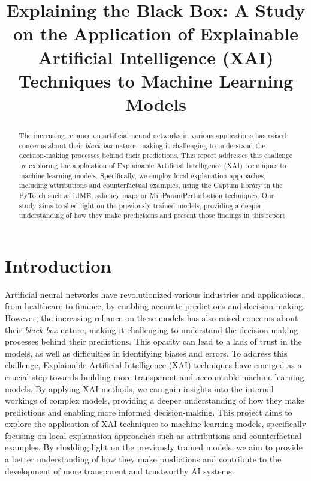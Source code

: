 \documentclass[conference]{IEEEtran}
\begin{document}
\title{Explaining the Black Box: A Study on the Application of Explainable Artificial Intelligence (XAI) Techniques to Machine Learning Models}
\author{
    \and
}

\maketitle

\begin{abstract}

    The increasing reliance on artificial neural networks in various applications has raised concerns about their \textit{black box} nature, making it challenging to understand the decision-making processes behind their predictions.
    This report addresses this challenge by exploring the application of Explainable Artificial Intelligence (XAI) techniques to machine learning models.
    Specifically, we employ local explanation approaches, including attributions and counterfactual examples, using the Captum library in the PyTorch such as LIME, saliency maps or MinParamPerturbation techniques.
    Our study aims to shed light on the previously trained models, providing a deeper understanding of how they make predictions and present those findings in this report

\end{abstract}

\section{Introduction}\label{sec:introduction}

    Artificial neural networks have revolutionized various industries and applications, from healthcare to finance, by enabling accurate predictions and decision-making.
    However, the increasing reliance on these models has also raised concerns about their \textit{black box} nature, making it challenging to understand the decision-making processes behind their predictions.
    This opacity can lead to a lack of trust in the models, as well as difficulties in identifying biases and errors.
    To address this challenge, Explainable Artificial Intelligence (XAI) techniques have emerged as a crucial step towards building more transparent and accountable machine learning models.
    By applying XAI methods, we can gain insights into the internal workings of complex models, providing a deeper understanding of how they make predictions and enabling more informed decision-making.
    This project aims to explore the application of XAI techniques to machine learning models, specifically focusing on local explanation approaches such as attributions and counterfactual examples.
    By shedding light on the previously trained models, we aim to provide a better understanding of how they make predictions and contribute to the development of more transparent and trustworthy AI systems.
\end{document}
